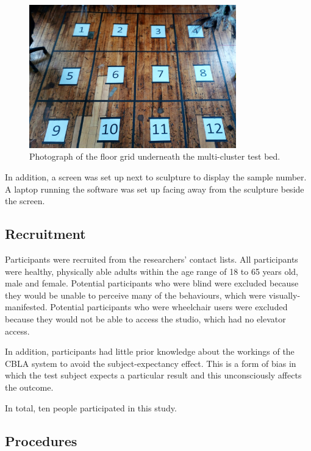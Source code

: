 \begin{figure} [!htb]
	\centering
	\includegraphics[width=0.8\textwidth]{"fig/validations/cbla-test-bed gird photo"}
	\caption[Photograph of the floor grid underneath the multi-cluster test bed]{Photograph of the floor grid underneath the multi-cluster test bed.}
	\label{fig:cbla-test-bed gird photo}
\end{figure}

In addition, a screen was set up next to sculpture to display the sample number. A laptop running the software was set up facing away from the sculpture beside the screen. 


\subsection{Recruitment}

Participants were recruited from the researchers' contact lists. All participants were healthy, physically able adults within the age range of 18 to 65 years old, male and female. Potential participants who were blind were excluded because they would be unable to perceive many of the behaviours, which were visually-manifested. Potential participants who were wheelchair users were excluded because they would not be able to access the studio, which had no elevator access.

In addition, participants had little prior knowledge about the workings of the CBLA system to avoid the subject-expectancy effect. This is a form of bias in which the test subject expects a particular result and this unconsciously affects the outcome. 

In total, ten people participated in this study.

\subsection{Procedures}\label{sec:user-study-procedure}

